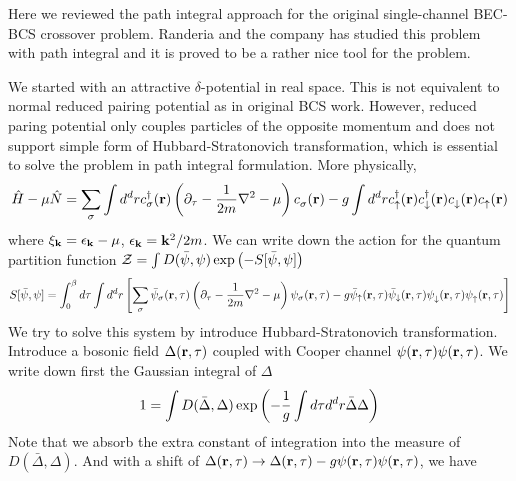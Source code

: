 \label{sec:pathInt}
Here we reviewed the path integral approach for the original single-channel BEC-BCS crossover problem. Randeria and the company \cite{RanderiaBEC, Randeria1997, Randeria2008} has studied this problem with path integral and it is proved to be a rather nice tool for the problem.  

We started with an attractive $\delta$-potential in real space.  This is not equivalent to normal reduced pairing potential as in original BCS work.  However, reduced paring potential only couples  particles of the opposite momentum and does not support simple form of Hubbard-Stratonovich transformation, which is essential to solve the problem in path integral formulation.   More physically,
\begin{equation}
\hat{H}-\mu\hat{N}=\sum_{\sigma}\int{d^{d}r}c^{\dagger}_{\sigma}(\mathbf{r})\left(\partial_{\tau}-\frac{1}{2m}\nabla^{2}-\mu\right)c^{}_{\sigma}(\mathbf{r})-g\int{d^{d}r}c^{\dagger}_{\uparrow}(\mathbf{r})c^{\dagger}_{\downarrow}(\mathbf{r})c^{}_{\downarrow}(\mathbf{r})c^{}_{\uparrow}(\mathbf{r})
\end{equation}
where $\xi_{\mathbf{k}}=\epsilon_{\mathbf{k}}-\mu$, $\epsilon_{\mathbf{k}}=\mathbf{k}^{2}/2m$.  We can write down the action for the quantum partition function $\mathcal{Z}=\int{D(\bar\psi,\psi)\exp\ensuremath{\left(-S[\bar\psi,\psi]\right)}}$
\begin{equation}
S[\bar\psi,\psi]=\int^{\beta}_{0}d\tau\int{d^{d}r}\left[\sum_{\sigma}\bar\psi_{\sigma}(\mathbf{r},\tau)\left(\partial_{\tau}-\frac{1}{2m}\nabla^{2}-\mu\right)\psi_{\sigma}(\mathbf{r},\tau)-g\bar\psi_{\uparrow}(\mathbf{r},\tau)\bar\psi_{\downarrow}(\mathbf{r},\tau)\psi^{}_{\downarrow}(\mathbf{r},\tau)\psi^{}_{\uparrow}(\mathbf{r},\tau)\right]
\end{equation}
We try to solve this system by introduce Hubbard-Stratonovich transformation.   Introduce a bosonic field $\Delta(\mathbf{r},\tau)$ coupled with Cooper channel $\psi(\mathbf{r},\tau)\psi(\mathbf{r},\tau)$. %
We write down first the Gaussian integral of $\Delta$
\begin{equation}
1=\int{D(\bar\Delta,\Delta)}\exp\left(-\frac{1}{g}\int{d\tau{d}^{d}r}\bar\Delta\Delta\right)
\end{equation}
Note that we absorb the extra constant of integration into the measure of $D(\bar\Delta,\Delta)$.
And with a shift of $\Delta(\mathbf{r},\tau)\rightarrow\Delta(\mathbf{r},\tau)-g\psi(\mathbf{r},\tau)\psi(\mathbf{r},\tau)$, we have 

